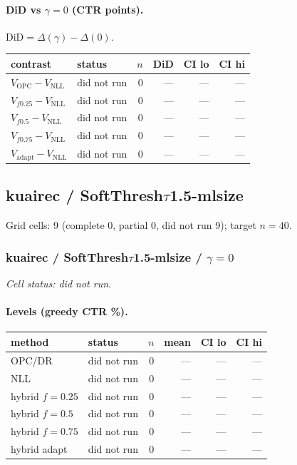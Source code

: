 \documentclass[10pt,a4paper]{article}
\begin{document}
\paragraph{DiD vs $\gamma=0$ (CTR points).} $\mathrm{DiD}=\Delta(\gamma)-\Delta(0)$.
{\centering\small\begin{tabular}{llrrrr}
\toprule contrast & status & $n$ & DiD & CI lo & CI hi \\
\midrule
$V_{\mathrm{OPC}}-V_{\mathrm{NLL}}$ & did not run & 0 & --- & --- & --- \\
$V_{f0.25}-V_{\mathrm{NLL}}$ & did not run & 0 & --- & --- & --- \\
$V_{f0.5}-V_{\mathrm{NLL}}$ & did not run & 0 & --- & --- & --- \\
$V_{f0.75}-V_{\mathrm{NLL}}$ & did not run & 0 & --- & --- & --- \\
$V_{\mathrm{adapt}}-V_{\mathrm{NLL}}$ & did not run & 0 & --- & --- & --- \\
\bottomrule\end{tabular}\par}
\bigskip
\newpage
\subsection{kuairec / SoftThresh$\tau$1.5-mlsize}
Grid cells: 9 (complete 0, partial 0, did not run 9); target $n=40$.
\subsubsection{kuairec / SoftThresh$\tau$1.5-mlsize / $\gamma=0$}
\emph{Cell status: did not run}.
\paragraph{Levels (greedy CTR \%).}
{\centering\small\begin{tabular}{llrrrr}
\toprule method & status & $n$ & mean & CI lo & CI hi \\
\midrule
OPC/DR & did not run & 0 & --- & --- & --- \\
NLL & did not run & 0 & --- & --- & --- \\
hybrid $f{=}0.25$ & did not run & 0 & --- & --- & --- \\
hybrid $f{=}0.5$ & did not run & 0 & --- & --- & --- \\
hybrid $f{=}0.75$ & did not run & 0 & --- & --- & --- \\
hybrid adapt & did not run & 0 & --- & --- & --- \\
\bottomrule\end{tabular}\par}
\end{document}
